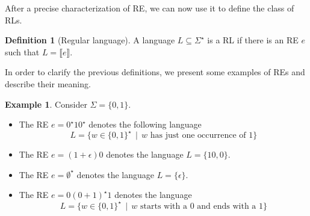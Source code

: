 \documentclass[oneside,12pt]{scrbook}
\theoremstyle{definition}
\newtheorem{Example}{Example}
\newcommand{\sembrackets}[1]{\ensuremath{\llbracket #1 \rrbracket}}
\theoremstyle{plain}
\theoremstyle{definition}
\newtheorem{Definition}{Definition}
\begin{document}
After a precise characterization of RE, we can now use it to define the class of RLs.

\begin{Definition}[Regular language]
	A language $L \subseteq \Sigma^\star$ is a RL if there is an RE 
	$e$ such that $L = \sembrackets{e}$.
\end{Definition}

In order to clarify the previous definitions, we present some examples of REs and describe their meaning.

\begin{Example}
	Consider $\Sigma =\{0,1\}$.
	\begin{itemize}
		\item The RE $e = 0^\star 10^\star$ denotes the following language
		\begin{equation*}L =\{w \in\{0,1\}^\star\,\mid\,w \text{ has just one occurrence of }1\}\end{equation*}
		\item The RE $e =(1 + \epsilon)0$ denotes the language $L = \{10, 0\}$.
		\item The RE $e = \emptyset^\star$ denotes the language $L = \{\epsilon\}$.
		\item The RE $e = 0(0 + 1)^\star 1$ denotes the language
		\begin{equation*}L =\{w \in\{0,1\}^\star\,\mid\,w \text{ starts with a 0 and ends with a 1}\}\end{equation*}
	\end{itemize}
\end{Example}
\end{document}
